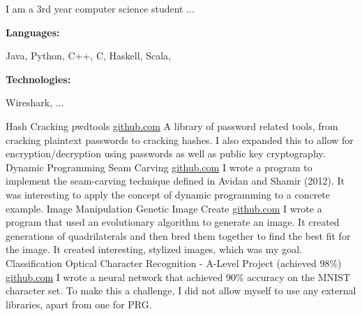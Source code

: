 \documentclass[9pt]{developercv} %
\begin{document}
\begin{minipage}[t]{0.46\textwidth}
	\vspace{-6pt}
 
	I am a 3rd year computer science student ...  \\
\end{minipage}
\hfill %
\begin{minipage}[t]{0.465\textwidth}
    \vspace{-6pt}
    
    \begin{minipage}[t]{0.2\textwidth}
        \textbf{Languages:}
    \end{minipage}
    \hfill
    \begin{minipage}[t]{0.73\textwidth}
      Java, Python, C++, C, Haskell, Scala, 
    \end{minipage}
    \vspace{4mm}
    
    \begin{minipage}[t]{0.2\textwidth}
        \textbf{Technologies:}
    \end{minipage}
    \hfill
    \begin{minipage}[t]{0.73\textwidth}
      Wireshark, ...
    \end{minipage}
    
\end{minipage}

\begin{entrylist}
    \entry
		{Hash Cracking}
		{pwdtools}
		{\href{https://github.com/JacobInwald/pwdtools}{github.com}}
		{
			A library of password related tools, from cracking plaintext passwords to cracking hashes. 
		 	I also expanded this to allow for encryption/decryption using passwords as well as public key cryptography.
		 }
    \entry
		{Dynamic Programming}
		{Seam Carving}
		{\href{https://github.com/JacobInwald/pwdtools}{github.com}}
		{
			I wrote a program to implement the seam-carving technique defined in Avidan and Shamir (2012). 
		 	It was interesting to apply the concept of dynamic programming to a concrete example.
		}
	\entry
		{Image Manipulation}
		{Genetic Image Create}
		{\href{https://github.com/JacobInwald/pwdtools}{github.com}}
		{
			I wrote a program that used an evolutionary algorithm to generate an image. 
			It created generations of quadrilaterals and then bred them together to find the best fit for the image.
			It created interesting, stylized images, which was my goal. 
		}
    \entry
		{Classification}
		{Optical Character Recognition - A-Level Project (achieved 98\%)}
		{\href{https://github.com/JacobInwald/pwdtools}{github.com}}
		{
			I wrote a neural network that achieved 90\% accuracy on the MNIST character set. 
			To make this a challenge, I did not allow myself to use any external libraries, apart from one for PRG.  
		}
\end{entrylist}
\end{document}

